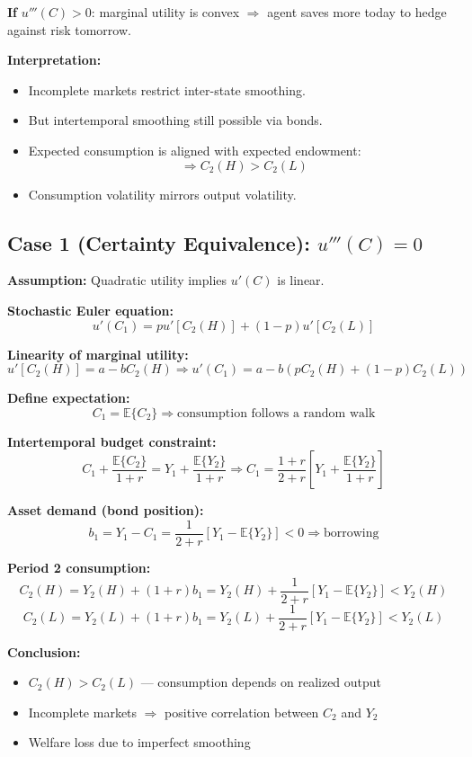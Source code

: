 \documentclass[12pt]{article}
\begin{document}
{\textbf{If } \( u'''(C) > 0 \): marginal utility is convex $\Rightarrow$ agent saves more today to hedge against risk tomorrow.

\textbf{Interpretation:}

\begin{itemize}
\item Incomplete markets restrict inter-state smoothing.
\item But intertemporal smoothing still possible via bonds.
\item Expected consumption is aligned with expected endowment:
\[
\Rightarrow C_2(H) > C_2(L)
\]
\item Consumption volatility mirrors output volatility.
\end{itemize}
}


\subsection*{\noindent\textbf{Case 1 (Certainty Equivalence): $u'''(C) = 0$}}

\textbf{Assumption:} Quadratic utility implies $u'(C)$ is linear.

\textbf{Stochastic Euler equation:}
\[
u'(C_1) = p u'[C_2(H)] + (1 - p) u'[C_2(L)]
\]

\textbf{Linearity of marginal utility:}
\[
u'[C_2(H)] = a - b C_2(H) \Rightarrow 
u'(C_1) = a - b \left( p C_2(H) + (1 - p) C_2(L) \right)
\]

\textbf{Define expectation:}
\[
C_1 = \mathbb{E}\{C_2\}
\Rightarrow \text{consumption follows a random walk}
\]

\textbf{Intertemporal budget constraint:}
\[
C_1 + \frac{\mathbb{E}\{C_2\}}{1 + r} = Y_1 + \frac{\mathbb{E}\{Y_2\}}{1 + r}
\Rightarrow
C_1 = \frac{1 + r}{2 + r} \left[Y_1 + \frac{\mathbb{E}\{Y_2\}}{1 + r} \right]
\]

\textbf{Asset demand (bond position):}
\[
b_1 = Y_1 - C_1 = \frac{1}{2 + r}[Y_1 - \mathbb{E}\{Y_2\}] < 0 \Rightarrow \text{borrowing}
\]

\textbf{Period 2 consumption:}
\[
C_2(H) = Y_2(H) + (1 + r) b_1 = Y_2(H) + \frac{1}{2 + r}[Y_1 - \mathbb{E}\{Y_2\}] < Y_2(H)
\]
\[
C_2(L) = Y_2(L) + (1 + r) b_1 = Y_2(L) + \frac{1}{2 + r}[Y_1 - \mathbb{E}\{Y_2\}] < Y_2(L)
\]

\textbf{Conclusion:}
\begin{itemize}
    \item $C_2(H) > C_2(L)$ — consumption depends on realized output
    \item Incomplete markets $\Rightarrow$ positive correlation between $C_2$ and $Y_2$
    \item Welfare loss due to imperfect smoothing
\end{itemize}
\end{document}
